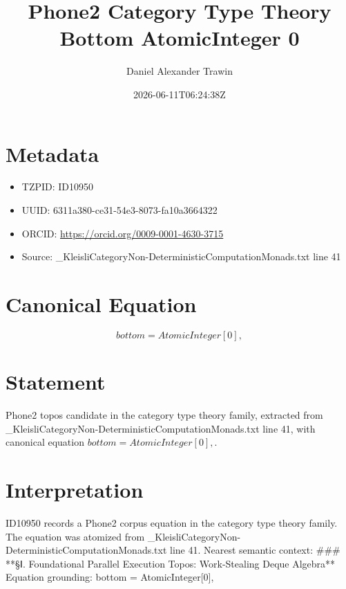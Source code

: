 \documentclass[11pt]{article}
\title{Phone2 Category Type Theory Bottom AtomicInteger 0}
\author{Daniel Alexander Trawin}
\date{2026-06-11T06:24:38Z}
\begin{document}
\maketitle
\section*{Metadata}
\begin{itemize}
\item TZPID: ID10950
\item UUID: 6311a380-ce31-54e3-8073-fa10a3664322
\item ORCID: \url{https://orcid.org/0009-0001-4630-3715}
\item Source: _KleisliCategoryNon-DeterministicComputationMonads.txt line 41
\end{itemize}
\section*{Canonical Equation}
\[
bottom = AtomicInteger[0],
\]
\section*{Statement}
Phone2 topos candidate in the category type theory family, extracted from _KleisliCategoryNon-DeterministicComputationMonads.txt line 41, with canonical equation $bottom = AtomicInteger[0],$.
\section*{Interpretation}
ID10950 records a Phone2 corpus equation in the category type theory family. The equation was atomized from _KleisliCategoryNon-DeterministicComputationMonads.txt line 41. Nearest semantic context: ### **§Ⅰ. Foundational Parallel Execution Topos: Work-Stealing Deque Algebra** Equation grounding: bottom = AtomicInteger[0],
\end{document}
